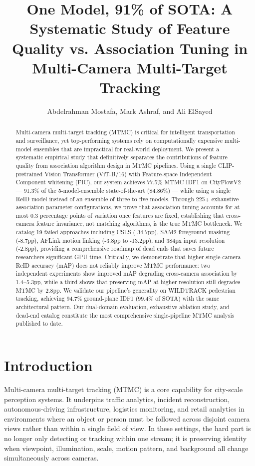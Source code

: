 \documentclass{ieeeaccess}
\title{One Model, 91\% of SOTA: A Systematic Study of Feature Quality vs. Association Tuning in Multi-Camera Multi-Target Tracking}
\author{Abdelrahman Mostafa, Mark Ashraf, and Ali ElSayed}
\begin{document}
\maketitle

\begin{abstract}
Multi-camera multi-target tracking (MTMC) is critical for intelligent transportation and surveillance, yet top-performing systems rely on computationally expensive multi-model ensembles that are impractical for real-world deployment. We present a systematic empirical study that definitively separates the contributions of feature quality from association algorithm design in MTMC pipelines. Using a single CLIP-pretrained Vision Transformer (ViT-B/16) with Feature-space Independent Component whitening (FIC), our system achieves 77.5\% MTMC IDF1 on CityFlowV2 --- 91.3\% of the 5-model-ensemble state-of-the-art (84.86\%) --- while using a single ReID model instead of an ensemble of three to five models. Through 225+ exhaustive association parameter configurations, we prove that association tuning accounts for at most 0.3 percentage points of variation once features are fixed, establishing that cross-camera feature invariance, not matching algorithms, is the true MTMC bottleneck. We catalog 19 failed approaches including CSLS (-34.7pp), SAM2 foreground masking (-8.7pp), AFLink motion linking (-3.8pp to -13.2pp), and 384px input resolution (-2.8pp), providing a comprehensive roadmap of dead ends that saves future researchers significant GPU time. Critically, we demonstrate that higher single-camera ReID accuracy (mAP) does not reliably improve MTMC performance: two independent experiments show improved mAP degrading cross-camera association by 1.4--5.3pp, while a third shows that preserving mAP at higher resolution still degrades MTMC by 2.8pp. We validate our pipeline's generality on WILDTRACK pedestrian tracking, achieving 94.7\% ground-plane IDF1 (99.4\% of SOTA) with the same architectural pattern. Our dual-domain evaluation, exhaustive ablation study, and dead-end catalog constitute the most comprehensive single-pipeline MTMC analysis published to date.
\end{abstract}

\section{Introduction}
Multi-camera multi-target tracking (MTMC) is a core capability for city-scale perception systems. It underpins traffic analytics, incident reconstruction, autonomous-driving infrastructure, logistics monitoring, and retail analytics in environments where an object or person must be followed across disjoint camera views rather than within a single field of view. In these settings, the hard part is no longer only detecting or tracking within one stream; it is preserving identity when viewpoint, illumination, scale, motion pattern, and background all change simultaneously across cameras.
\end{document}
